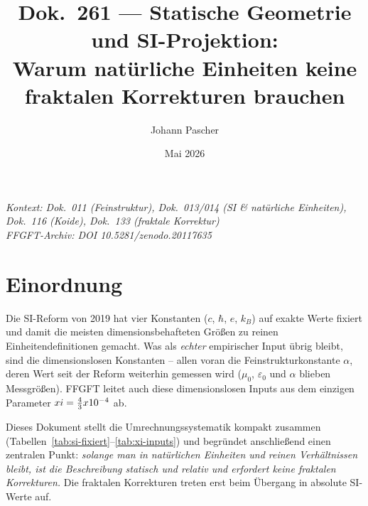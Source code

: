 
\title{Dok.~261 — Statische Geometrie und SI-Projektion:\\
Warum natürliche Einheiten keine fraktalen Korrekturen brauchen}
\author{Johann Pascher}
\date{Mai 2026}
\maketitle

\begin{center}
\textit{Kontext: Dok.~011 (Feinstruktur), Dok.~013/014 (SI \& natürliche Einheiten),
Dok.~116 (Koide), Dok.~133 (fraktale Korrektur)} \\[2pt]
\textit{FFGFT-Archiv: DOI 10.5281/zenodo.20117635}
\end{center}

\tableofcontents
\newpage

\section{Einordnung}

Die SI-Reform von 2019 hat vier Konstanten ($c$, $\hbar$, $e$, $k_B$) auf exakte
Werte fixiert und damit die meisten dimensionsbehafteten Größen zu reinen
Einheitendefinitionen gemacht. Was als \emph{echter} empirischer Input übrig
bleibt, sind die dimensionslosen Konstanten -- allen voran die
Feinstrukturkonstante $\alpha$, deren Wert seit der Reform weiterhin gemessen
wird ($\mu_0$, $\varepsilon_0$ und $\alpha$ blieben Messgrößen). FFGFT leitet
auch diese dimensionslosen Inputs aus dem einzigen Parameter
$xi = \tfrac{4}{3}x 10^{-4}$ ab.

Dieses Dokument stellt die Umrechnungssystematik kompakt zusammen
(Tabellen~\ref{tab:si-fixiert}--\ref{tab:xi-inputs}) und begründet anschließend
einen zentralen Punkt: \emph{solange man in natürlichen Einheiten und reinen
Verhältnissen bleibt, ist die Beschreibung statisch und relativ und erfordert
keine fraktalen Korrekturen.} Die fraktalen Korrekturen treten erst beim Übergang
in absolute SI-Werte auf.

